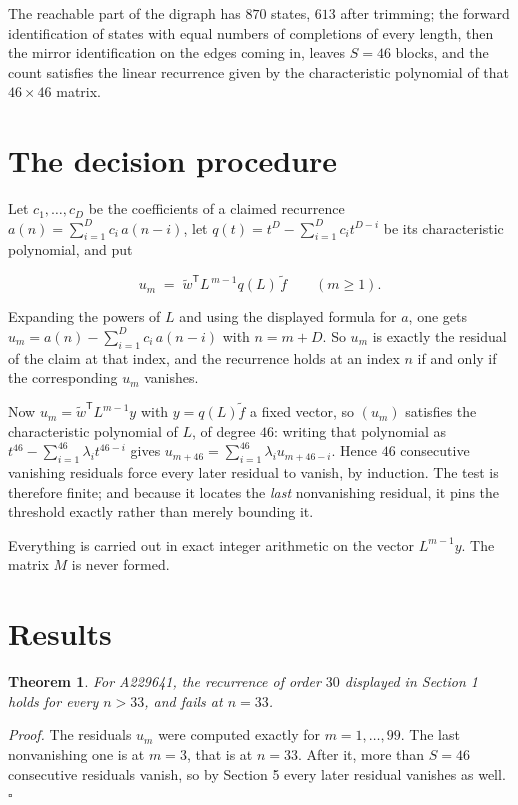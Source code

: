 \documentclass[11pt]{article}
\newtheorem{theorem}{Theorem}
\theoremstyle{definition}
\begin{document}
The reachable part of the digraph has $870$ states, $613$ after trimming; the forward identification of states with equal numbers of completions of every length, then the mirror identification on the edges coming in, leaves $S = 46$ blocks, and the count satisfies the linear recurrence given by the characteristic polynomial of that $46\times46$ matrix.

\section{The decision procedure}

Let $c_1,\dots,c_D$ be the coefficients of a claimed recurrence $a(n) = \sum_{i=1}^{D} c_i\,a(n-i)$, let $q(t) = t^{D} - \sum_{i=1}^{D} c_i t^{D-i}$ be its characteristic polynomial, and put

\[u_m \;=\; \tilde w^{\mathsf T} L^{\,m-1} q(L)\,\tilde f \qquad (m \ge 1).\]

Expanding the powers of $L$ and using the displayed formula for $a$, one gets $u_m = a(n) - \sum_{i=1}^{D} c_i\,a(n-i)$ with $n = m + D$. So $u_m$ is exactly the residual of the claim at that index, and the recurrence holds at an index $n$ if and only if the corresponding $u_m$ vanishes.

Now $u_m = \tilde w^{\mathsf T} L^{m-1} y$ with $y = q(L)\tilde f$ a fixed vector, so $(u_m)$ satisfies the characteristic polynomial of $L$, of degree $46$: writing that polynomial as $t^{46} - \sum_{i=1}^{46} \lambda_i t^{46-i}$ gives $u_{m+46} = \sum_{i=1}^{46} \lambda_i u_{m+46-i}$. Hence $46$ consecutive vanishing residuals force every later residual to vanish, by induction. The test is therefore finite; and because it locates the {\itshape last} nonvanishing residual, it pins the threshold exactly rather than merely bounding it.

Everything is carried out in exact integer arithmetic on the vector $L^{m-1}y$. The matrix $M$ is never formed.

\section{Results}

\begin{theorem} For A229641, the recurrence of order $30$ displayed in Section 1 holds for every $n > 33$, and fails at $n = 33$.\end{theorem}

{\itshape Proof.} The residuals $u_m$ were computed exactly for $m = 1,\dots,99$. The last nonvanishing one is at $m = 3$, that is at $n = 33$. After it, more than $S = 46$ consecutive residuals vanish, so by Section 5 every later residual vanishes as well. $\square$
\end{document}
